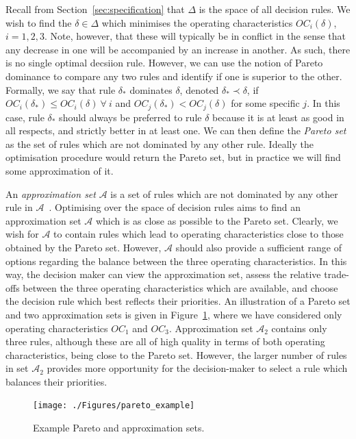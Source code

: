 \documentclass{article} %
\begin{document}
Recall from Section~\ref{sec:specification} that $\Delta$ is the space of all decision rules. We wish to find the $\delta \in \Delta$ which minimises the operating characteristics $OC_{i}(\delta)$, $i= 1,2,3$. Note, however, that these will typically be in conflict in the sense that any decrease in one will be accompanied by an increase in another. As such, there is no single optimal decsiion rule. However, we can use the notion of Pareto dominance to compare any two rules and identify if one is superior to the other. Formally, we say that rule $\delta_{*}$ dominates $\delta$, denoted $\delta_{*} \prec \delta$, if $OC_{i}(\delta_{*}) \leq OC_{i}(\delta) ~ \forall ~ i$ and $OC_{j}(\delta_{*}) < OC_{j}(\delta)$ for some specific $j$. In this case, rule $\delta_{*}$ should always be preferred to rule $\delta$ because it is at least as good in all respects, and strictly better in at least one. We can then define the \emph{Pareto set} as the set of rules which are not dominated by any other rule. Ideally the optimisation procedure would return the Pareto set, but in practice we will find some approximation of it. 

An \emph{approximation set} $\mathcal{A}$ is a set of rules which are not dominated by any other rule in $\mathcal{A}$~\cite{Emmerich2011}. Optimising over the space of decision rules aims to find an approximation set $\mathcal{A}$ which is as close as possible to the Pareto set. Clearly, we wish for $\mathcal{A}$ to contain rules which lead to operating characteristics close to those obtained by the Pareto set. However, $\mathcal{A}$ should also provide a sufficient range of options regarding the balance between the three operating characteristics. In this way, the decision maker can view the approximation set, assess the relative trade-offs between the three operating characteristics which are available, and choose the decision rule which best reflects their priorities. An illustration of a Pareto set and two approximation sets is given in Figure~\ref{fig:pareto_example}, where we have considered only operating characteristics $OC_{1}$ and $OC_{3}$. Approximation set $\mathcal{A}_{2}$ contains only three rules, although these are all of high quality in terms of both operating characteristics, being close to the Pareto set. However, the larger number of rules in set $\mathcal{A}_{2}$ provides more opportunity for the decision-maker to select a rule which balances their priorities.

\begin{figure}
\centering
\texttt{[image: ./Figures/pareto\_example]}
\caption{Example Pareto and approximation sets.}
\label{fig:pareto_example}
\end{figure}
\end{document}
